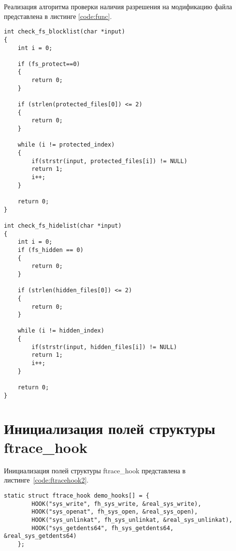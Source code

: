 Реализация алгоритма проверки наличия разрешения на модификацию файла представлена в листинге \ref{code:func}.

\begin{lstlisting}[label=code:func,caption=Реализация алгоритма проверки наличия разрешения на модификацию файла]
int check_fs_blocklist(char *input)
{
	int i = 0;
	
	if (fs_protect==0)
	{
		return 0;
	}
	
	if (strlen(protected_files[0]) <= 2)
	{
		return 0;
	}
	
	while (i != protected_index)
	{
		if(strstr(input, protected_files[i]) != NULL)
		return 1;
		i++;
	}
	
	return 0;
}

int check_fs_hidelist(char *input)
{
	int i = 0;
	if (fs_hidden == 0)
	{
		return 0;
	}
	
	if (strlen(hidden_files[0]) <= 2)
	{
		return 0;
	}
	
	while (i != hidden_index)
	{
		if(strstr(input, hidden_files[i]) != NULL)
		return 1;
		i++;
	}
	
	return 0;
}
\end{lstlisting}

\section{Инициализация полей структуры ftrace\_hook}

Инициализация полей структуры ftrace\_hook представлена в листинге~\ref{code:ftracehook2}.

\begin{lstlisting}[label=code:ftracehook2,caption=Инициализация полей структуры ftrace\_hook]
	static struct ftrace_hook demo_hooks[] = {
		HOOK("sys_write", fh_sys_write, &real_sys_write),
		HOOK("sys_openat", fh_sys_open, &real_sys_open),
		HOOK("sys_unlinkat", fh_sys_unlinkat, &real_sys_unlinkat),
		HOOK("sys_getdents64", fh_sys_getdents64, &real_sys_getdents64)
	};
\end{lstlisting}


